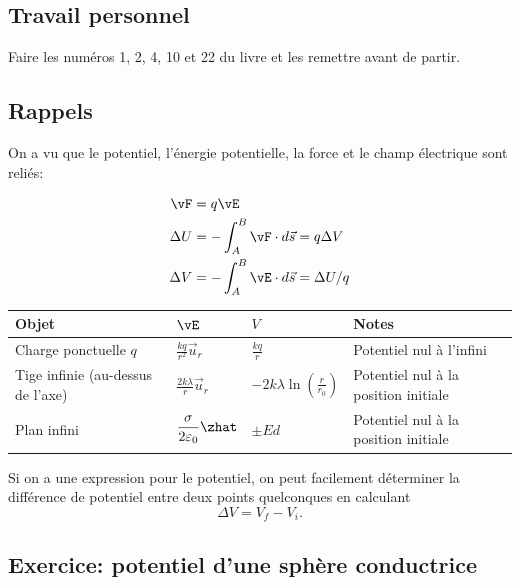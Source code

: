 \sectionline


\subsection*{Travail personnel}

Faire les numéros 1, 2, 4, 10 et 22 du livre et les remettre avant de partir.


\sectionline


\subsection*{Rappels}

On a vu que le potentiel, l'énergie potentielle, la force et le champ
électrique sont reliés:

\begin{align*}
  \vF &= q\vE  \\
  \Delta U &= -\int_A^B \vF \cdot d\vec{s} = q \Delta V \\
  \Delta V &= -\int_A^B \vE \cdot d\vec{s} = \Delta U / q
\end{align*}

\begin{center}
\begin{tabular}{p{4cm}llp{4cm}}
  \toprule
  Objet    &     $\vE$      &   $V$     &  Notes  \\
  \midrule
  Charge ponctuelle $q$  &
      $\displaystyle{\frac{kq}{r^2} \vec{u}_r}$  &
      $\displaystyle{\frac{kq}{r}}$  &
      Potentiel nul à l'infini   \\[10pt]
  Tige infinie (au-dessus de l'axe)  &
      $\displaystyle{\frac{2k \lambda}{r}}\vec{u}_r$  &
      $\displaystyle{-2k \lambda \ln \left( \frac{r}{r_0} \right)}$  &
      Potentiel nul à la position initiale  \\[10pt]
  Plan infini  &
      $\displaystyle{\frac{\sigma}{2\varepsilon_0}\zhat}$  &
      $\displaystyle{\pm Ed}$  &
      Potentiel nul à la position initiale  \\[10pt]
  \bottomrule
\end{tabular}
\end{center}

Si on a une expression pour le potentiel, on peut facilement déterminer la
différence de potentiel entre deux points quelconques en calculant
\[\Delta V = V_f - V_i.\]



\subsection*{Exercice: potentiel d'une sphère conductrice}

